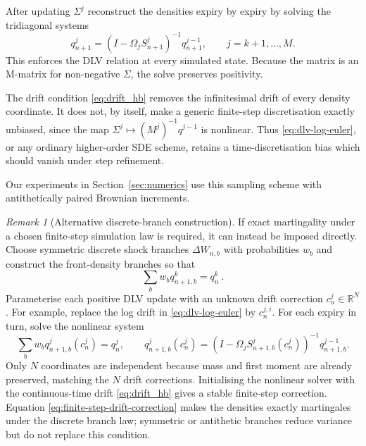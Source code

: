 \documentclass[11pt]{article}
\theoremstyle{plain}
\theoremstyle{definition}
\theoremstyle{remark}
\newtheorem{remark}[theorem]{Remark}
\begin{document}
  After updating $\Sigma^{j}$ reconstruct the densities expiry by expiry by
  solving the tridiagonal systems
  \begin{equation}
    \label{eq:density-algebraic-step}
    q_{n+1}^{j}
      =\left(I-\Omega_jS_{n+1}^{j}\right)^{-1}q_{n+1}^{j-1},
    \qquad j=k+1,\ldots,M.
  \end{equation}
  This enforces the DLV relation at every simulated state. Because the matrix
  is an M-matrix for non-negative $\Sigma$, the solve preserves positivity.

  The drift condition \eqref{eq:drift_hb} removes the infinitesimal drift of
  every density coordinate. It does not, by itself, make a generic finite-step
  discretisation exactly unbiased, since the map
  $\Sigma^j\mapsto(M^j)^{-1}q^{j-1}$ is nonlinear. Thus
  \eqref{eq:dlv-log-euler}, or any ordinary higher-order SDE scheme, retains a
  time-discretisation bias which should vanish under step refinement.

  Our experiments in Section~\ref{sec:numerics} use this sampling scheme with antithetically paired Brownian increments.

\begin{remark}[Alternative discrete-branch construction]
  \label{rem:discrete-branch-sampling}
  If exact martingality under a chosen finite-step simulation law is required,
  it can instead be imposed directly. Choose symmetric discrete shock branches
  $\Delta W_{n,b}$ with probabilities $w_b$ and construct the front-density
  branches so that
  \[
    \sum_b w_bq_{n+1,b}^k=q_n^k \ .
  \]
  Parameterise each positive DLV update with an unknown drift correction
  $c_n^j\in\mathbb R^N$. For example, replace the log drift in
  \eqref{eq:dlv-log-euler} by $c_n^{j,i}$. For each expiry in turn, solve the
  nonlinear system
  \begin{equation}
    \label{eq:finite-step-drift-correction}
    \sum_b w_b q_{n+1,b}^j(c_n^j)=q_n^j,
    \qquad
    q_{n+1,b}^j(c_n^j)
      =\left(I-\Omega_jS_{n+1,b}^j(c_n^j)\right)^{-1}
        q_{n+1,b}^{j-1}.
  \end{equation}
  Only $N$ coordinates are independent because mass and first moment are
  already preserved, matching the $N$ drift corrections. Initialising the
  nonlinear solver with the continuous-time drift
  \eqref{eq:drift_hb} gives
  a stable finite-step correction. Equation
  \eqref{eq:finite-step-drift-correction} makes the densities exactly
  martingales under the discrete branch law; symmetric or antithetic branches
  reduce variance but do not replace this condition.

\end{remark}
\end{document}

